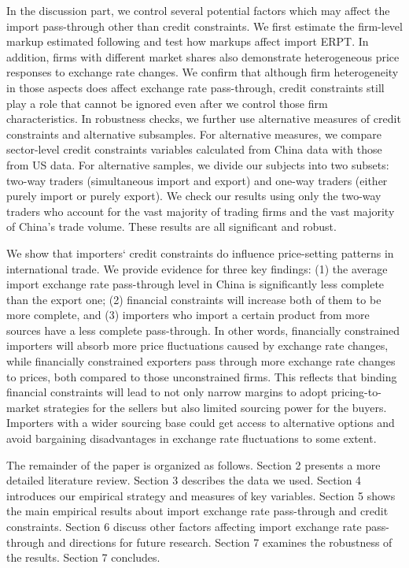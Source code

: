 In the discussion part, we control several potential factors which may affect the import pass-through other than credit constraints. We first estimate the firm-level markup estimated following \cite{dlw2012} and test how markups affect import ERPT. In addition, firms with different market shares also demonstrate heterogeneous price responses to exchange rate changes. We confirm that although firm heterogeneity in those aspects does affect exchange rate pass-through, credit constraints still play a role that cannot be ignored even after we control those firm characteristics. In robustness checks, we further use alternative measures of credit constraints and alternative subsamples. For alternative measures, we compare sector-level credit constraints variables calculated from China data with those from US data. For alternative samples, we divide our subjects into two subsets: two-way traders (simultaneous import and export) and one-way traders (either purely import or purely export). We check our results using only the two-way traders who account for the vast majority of trading firms and the vast majority of China's trade volume. These results are all significant and robust.

We show that importers‘ credit constraints do influence price-setting patterns in international trade. We provide evidence for three key findings: (1) the average import exchange rate pass-through level in China is significantly less complete than the export one; (2) financial constraints will increase both of them to be more complete, and (3) importers who import a certain product from more sources have a less complete pass-through. In other words, financially constrained importers will absorb more price fluctuations caused by exchange rate changes, while financially constrained exporters pass through more exchange rate changes to prices, both compared to those unconstrained firms. This reflects that binding financial constraints will lead to not only narrow margins to adopt pricing-to-market strategies for the sellers but also limited sourcing power for the buyers. Importers with a wider sourcing base could get access to alternative options and avoid bargaining disadvantages in exchange rate fluctuations to some extent.

The remainder of the paper is organized as follows. Section 2 presents a more detailed literature review. Section 3 describes the data we used. Section 4 introduces our empirical strategy and measures of key variables. Section 5 shows the main empirical results about import exchange rate pass-through and credit constraints. Section 6 discuss other factors affecting import exchange rate pass-through and directions for future research. Section 7 examines the robustness of the results. Section 7 concludes.

\newpage